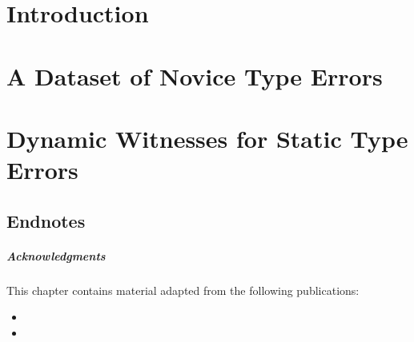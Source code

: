 \documentclass[11pt]{ucsddissertation}
\theoremstyle{plain}%
\theoremstyle{definition}
\begin{document}


\lstMakeShortInline{|}

\chapter{Introduction}
\label{chp:intro}


\chapter{A Dataset of Novice Type Errors}
\label{chp:data-collection}


\chapter{Dynamic Witnesses for Static Type Errors}
\label{chp:nanomaly}
\newcommand\toolname{\tool{NanoMaLy}}






\section*{Endnotes}
\paragraph{Acknowledgments}
This chapter contains material adapted from the following publications:
\begin{itemize}
\item {}
\item {}
\end{itemize}
\end{document}
